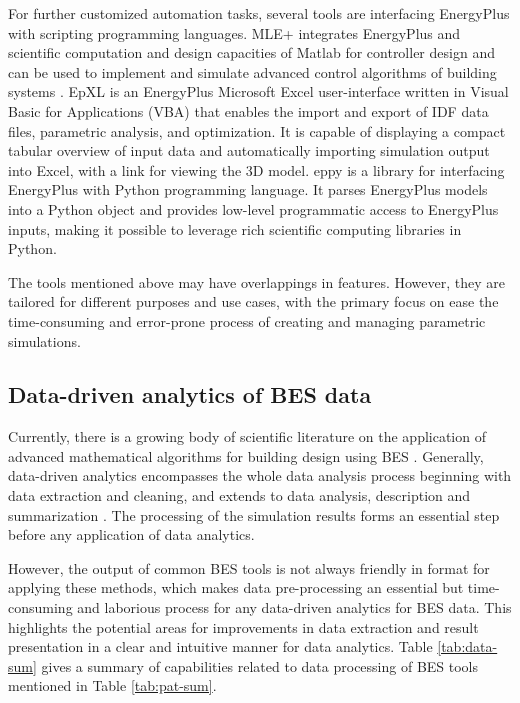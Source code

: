 \documentclass[3p, times]{elsarticle} %
\begin{document}
For further customized automation tasks, several tools are interfacing
EnergyPlus with scripting programming languages.
MLE+ integrates EnergyPlus and scientific computation and design capacities of
Matlab for controller design and can be used to implement and simulate advanced
control algorithms of building systems \citep{Bernal2012, Zhao2013b}.
EpXL \citep{Schild2020} is an EnergyPlus Microsoft Excel user-interface written in
Visual Basic for Applications (VBA) that enables the import and export of IDF
data files, parametric analysis, and optimization.
It is capable of displaying a compact tabular overview of input data and
automatically importing simulation output into Excel, with a link for viewing
the 3D model.
eppy \citep{Philip2020} is a library for interfacing EnergyPlus with Python
programming language.
It parses EnergyPlus models into a Python object and provides low-level
programmatic access to EnergyPlus inputs, making it possible to leverage rich
scientific computing libraries in Python.

The tools mentioned above may have overlappings in features. However, they are
tailored for different purposes and use cases, with the primary focus on ease
the time-consuming and error-prone process of creating and managing parametric
simulations.

\hypertarget{data-driven-analytics-of-bes-data}{%
\subsection{Data-driven analytics of BES data}\label{data-driven-analytics-of-bes-data}}

Currently, there is a growing body of scientific literature on the application
of advanced mathematical algorithms for building design using BES \citep{Kiss2020, Wei2018review}.
Generally, data-driven analytics encompasses the whole data analysis process
beginning with data extraction and cleaning, and extends to data analysis,
description and summarization \citep{Molina-Solana2017, BurakGunay2019}.
The processing of the simulation results forms an essential step before any
application of data analytics.

However, the output of common BES tools is not always friendly in format for
applying these methods, which makes data pre-processing an essential but
time-consuming and laborious process for any data-driven analytics for BES
data.
This highlights the potential areas for improvements in data extraction and
result presentation in a clear and intuitive manner for data analytics.
Table \ref{tab:data-sum} gives a summary of capabilities related to data
processing of BES tools mentioned in Table \ref{tab:pat-sum}.
\end{document}
